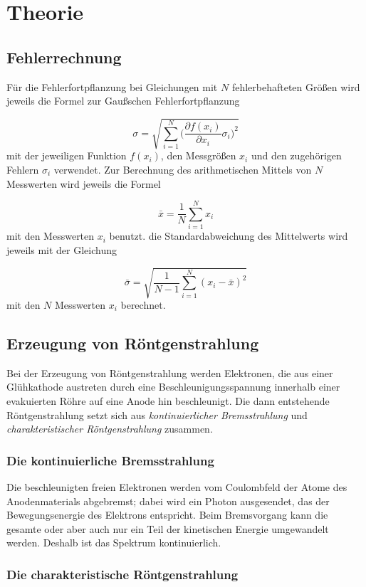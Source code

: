 \section{Theorie}
\label{sec:Theorie}

\subsection{Fehlerrechnung}

Für die Fehlerfortpflanzung bei Gleichungen mit $N$ fehlerbehafteten Größen
wird jeweils die Formel zur Gaußschen Fehlerfortpflanzung

\begin{equation}
  \sigma = \sqrt{\sum_{i=1}^{N}\biggl(\frac{\partial f(x_i)}{\partial x_i}
  \sigma_i\biggr)^2}
\end{equation}
mit der jeweiligen Funktion $f(x_i)$, den Messgrößen $x_i$ und den
zugehörigen Fehlern $\sigma_i$ verwendet.
Zur Berechnung des arithmetischen Mittels von $N$ Messwerten wird jeweils die
Formel

\begin{equation}
  \bar{x} = \frac{1}{N}\sum_{i=1}^{N}x_i
\end{equation}
mit den Messwerten $x_i$ benutzt.
die Standardabweichung des Mittelwerts wird jeweils mit der Gleichung

\begin{equation}
  \bar{\sigma} = \sqrt{\frac{1}{N-1}\sum_{i=1}^{N}(x_i - \bar{x})^2}
\end{equation}
mit den $N$ Messwerten $x_i$ berechnet.

\subsection{Erzeugung von Röntgenstrahlung}

Bei der Erzeugung von Röntgenstrahlung werden Elektronen, die aus einer Glühkathode
austreten durch eine Beschleunigungsspannung innerhalb einer evakuierten Röhre
auf eine Anode  hin beschleunigt. Die dann entstehende Röntgenstrahlung setzt sich
aus \emph{kontinuierlicher Bremsstrahlung} und \emph{charakteristischer Röntgenstrahlung}
zusammen.

\subsubsection{Die kontinuierliche Bremsstrahlung}

Die beschleunigten freien Elektronen werden vom Coulombfeld der Atome des Anodenmaterials
abgebremst; dabei wird ein Photon ausgesendet, das der Bewegungsenergie des  Elektrons
entspricht. Beim Bremsvorgang kann die gesamte oder aber auch nur ein Teil der
kinetischen Energie umgewandelt werden. Deshalb ist das Spektrum kontinuierlich.

\subsubsection{Die charakteristische Röntgenstrahlung}

\cite{anleitung}

